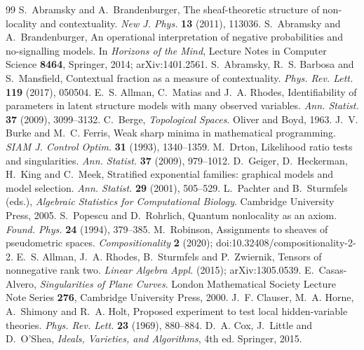 \documentclass[11pt]{article}
\theoremstyle{definition}\newtheorem{definition}[theorem]{Definition}\newtheorem{remark}[theorem]{Remark}\newtheorem{example}[theorem]{Example}
\begin{document}
\begin{thebibliography}{99}\small
{} S.~Abramsky and A.~Brandenburger, The sheaf-theoretic structure of non-locality and
  contextuality. \emph{New J. Phys.} \textbf{13} (2011), 113036.
 S.~Abramsky and A.~Brandenburger, An operational interpretation of negative probabilities and
  no-signalling models. In \emph{Horizons of the Mind}, Lecture Notes in Computer Science \textbf{8464}, Springer, 2014;
  arXiv:1401.2561.
 S.~Abramsky, R.~S. Barbosa and S.~Mansfield, Contextual fraction as a measure of
  contextuality. \emph{Phys. Rev. Lett.} \textbf{119} (2017), 050504.
 E.~S. Allman, C.~Matias and J.~A. Rhodes, Identifiability of parameters in latent structure models with
  many observed variables. \emph{Ann. Statist.} \textbf{37} (2009), 3099--3132.
 C.~Berge, \emph{Topological Spaces}. Oliver and Boyd, 1963.
 J.~V. Burke and M.~C. Ferris, Weak sharp minima in mathematical programming. \emph{SIAM J. Control
  Optim.} \textbf{31} (1993), 1340--1359.
 M.~Drton, Likelihood ratio tests and singularities. \emph{Ann. Statist.} \textbf{37} (2009), 979--1012.
 D.~Geiger, D.~Heckerman, H.~King and C.~Meek, Stratified exponential families: graphical models and model
  selection. \emph{Ann. Statist.} \textbf{29} (2001), 505--529.
 L.~Pachter and B.~Sturmfels (eds.), \emph{Algebraic Statistics for Computational Biology}. Cambridge
  University Press, 2005.
 S.~Popescu and D.~Rohrlich, Quantum nonlocality as an axiom. \emph{Found. Phys.} \textbf{24}
  (1994), 379--385.
 M.~Robinson, Assignments to sheaves of pseudometric spaces. \emph{Compositionality} \textbf{2} (2020);
  doi:10.32408/compositionality-2-2.
 E.~S. Allman, J.~A. Rhodes, B.~Sturmfels and P.~Zwiernik, Tensors of nonnegative rank two.
  \emph{Linear Algebra Appl.} (2015); arXiv:1305.0539.
 E.~Casas-Alvero, \emph{Singularities of Plane Curves}. London Mathematical Society Lecture Note Series
  \textbf{276}, Cambridge University Press, 2000.
 J.~F. Clauser, M.~A. Horne, A.~Shimony and R.~A. Holt, Proposed experiment to test local hidden-variable theories.
  \emph{Phys. Rev. Lett.} \textbf{23} (1969), 880--884.
 D.~A. Cox, J.~Little and D.~O'Shea, \emph{Ideals, Varieties, and Algorithms}, 4th ed. Springer, 2015.

\end{thebibliography}
\end{document}
